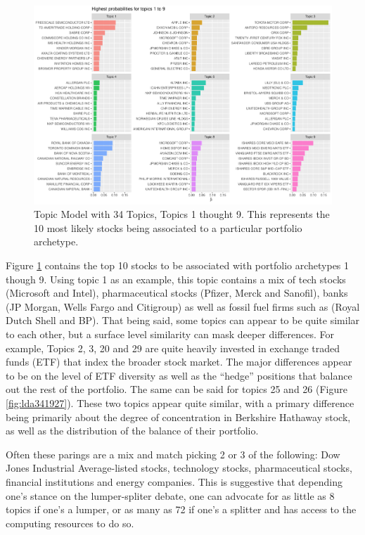 \begin{figure}
	\centering
	\includegraphics[width=\linewidth]{Figures/ChapterV/LDA34_1-9}
	\caption[Topic Model with 34 Topics, Topics 1 thought 9]{Topic Model with 34 Topics, Topics 1 thought 9. This represents the 10 most likely stocks being associated to a particular portfolio archetype.}
	\label{fig:lda341-9}
\end{figure}

Figure \ref{fig:lda341-9} contains the top 10 stocks to be associated with portfolio archetypes 1 though 9.  Using topic 1 as an example, this topic contains a mix of tech stocks (Microsoft and Intel), pharmaceutical stocks (Pfizer, Merck and Sanofil), banks (JP Morgan,  Wells Fargo and Citigroup) as well as fossil fuel firms such as (Royal Dutch Shell and BP).  That being said, some topics can appear to be quite similar to each other, but a surface level similarity can mask deeper differences.  For example,  Topics 2, 3, 20 and 29 are quite heavily invested in exchange traded funds (ETF) that index the broader stock market.  The major differences appear to be on the level of ETF diversity as well as the ``hedge'' positions that balance out the rest of the portfolio.  The same can be said for topics 25 and 26 (Figure \ref{fig:lda341927}). These two topics appear quite similar, with a primary difference being primarily about the degree of concentration in Berkshire Hathaway stock, as well as the distribution of the balance of their portfolio.  

Often these parings are a mix and match picking 2 or 3 of the following: Dow Jones Industrial Average-listed stocks, technology stocks, pharmaceutical stocks, financial institutions and energy companies. This is suggestive that depending one's stance on the lumper-spliter debate, one can advocate for as little as 8 topics if one's a lumper, or as many as 72 if one's a splitter and has access to the computing resources to do so.  

